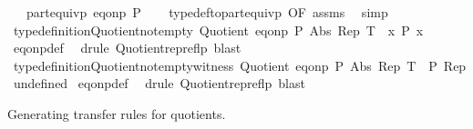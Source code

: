 \begin{isabellebody}
\ \ \ {\isachardoublequoteopen}part{\isacharunderscore}{\kern0pt}equivp\ {\isacharparenleft}{\kern0pt}eq{\isacharunderscore}{\kern0pt}onp\ P{\isacharparenright}{\kern0pt}{\isachardoublequoteclose}\isanewline
%
\isadelimproof
\ \ %
\endisadelimproof
%
\isatagproof
{}\isamarkupfalse%
\ typedef{\isacharunderscore}{\kern0pt}to{\isacharunderscore}{\kern0pt}part{\isacharunderscore}{\kern0pt}equivp\ {\isacharbrackleft}{\kern0pt}OF\ assms{\isacharbrackright}{\kern0pt}\ \isamarkupfalse%
\ simp%
\endisatagproof
{\isafoldproof}%
%
\isadelimproof
\isanewline
%
\endisadelimproof
\isanewline
{}\isamarkupfalse%
\ type{\isacharunderscore}{\kern0pt}definition{\isacharunderscore}{\kern0pt}Quotient{\isacharunderscore}{\kern0pt}not{\isacharunderscore}{\kern0pt}empty{\isacharcolon}{\kern0pt}\ {\isachardoublequoteopen}Quotient\ {\isacharparenleft}{\kern0pt}eq{\isacharunderscore}{\kern0pt}onp\ P{\isacharparenright}{\kern0pt}\ Abs\ Rep\ T\ {\isasymLongrightarrow}\ {\isasymexists}x{\isachardot}{\kern0pt}\ P\ x{\isachardoublequoteclose}\isanewline
%
\isadelimproof
%
\endisadelimproof
%
\isatagproof
{}\isamarkupfalse%
\ eq{\isacharunderscore}{\kern0pt}onp{\isacharunderscore}{\kern0pt}def\ \isamarkupfalse%
\ {\isacharparenleft}{\kern0pt}drule\ Quotient{\isacharunderscore}{\kern0pt}rep{\isacharunderscore}{\kern0pt}reflp{\isacharparenright}{\kern0pt}\ blast%
\endisatagproof
{\isafoldproof}%
%
\isadelimproof
\isanewline
%
\endisadelimproof
\isanewline
{}\isamarkupfalse%
\ type{\isacharunderscore}{\kern0pt}definition{\isacharunderscore}{\kern0pt}Quotient{\isacharunderscore}{\kern0pt}not{\isacharunderscore}{\kern0pt}empty{\isacharunderscore}{\kern0pt}witness{\isacharcolon}{\kern0pt}\ {\isachardoublequoteopen}Quotient\ {\isacharparenleft}{\kern0pt}eq{\isacharunderscore}{\kern0pt}onp\ P{\isacharparenright}{\kern0pt}\ Abs\ Rep\ T\ {\isasymLongrightarrow}\ P\ {\isacharparenleft}{\kern0pt}Rep\ undefined{\isacharparenright}{\kern0pt}{\isachardoublequoteclose}\isanewline
%
\isadelimproof
%
\endisadelimproof
%
\isatagproof
{}\isamarkupfalse%
\ eq{\isacharunderscore}{\kern0pt}onp{\isacharunderscore}{\kern0pt}def\ \isamarkupfalse%
\ {\isacharparenleft}{\kern0pt}drule\ Quotient{\isacharunderscore}{\kern0pt}rep{\isacharunderscore}{\kern0pt}reflp{\isacharparenright}{\kern0pt}\ blast%
\endisatagproof
{\isafoldproof}%
%
\isadelimproof
%
\endisadelimproof
%
\begin{isamarkuptext}%
Generating transfer rules for quotients.%

\end{isamarkuptext}
\end{isabellebody}

